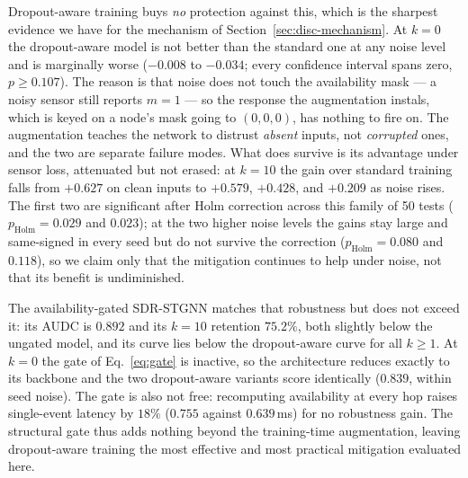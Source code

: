 \documentclass[3p,times,procedia]{elsarticle}
\begin{document}
Dropout-aware training buys \emph{no} protection against this, which is the sharpest evidence we have for the mechanism of Section~\ref{sec:disc-mechanism}. At $k=0$ the dropout-aware model is not better than the standard one at any noise level and is marginally worse ($-0.008$ to $-0.034$; every confidence interval spans zero, $p\ge0.107$). The reason is that noise does not touch the availability mask --- a noisy sensor still reports $m=1$ --- so the response the augmentation instals, which is keyed on a node's mask going to $(0,0,0)$, has nothing to fire on. The augmentation teaches the network to distrust \emph{absent} inputs, not \emph{corrupted} ones, and the two are separate failure modes. What does survive is its advantage under sensor loss, attenuated but not erased: at $k=10$ the gain over standard training falls from $+0.627$ on clean inputs to $+0.579$, $+0.428$, and $+0.209$ as noise rises. The first two are significant after Holm correction across this family of 50 tests ($p_{\text{Holm}}=0.029$ and $0.023$); at the two higher noise levels the gains stay large and same-signed in every seed but do not survive the correction ($p_{\text{Holm}}=0.080$ and $0.118$), so we claim only that the mitigation continues to help under noise, not that its benefit is undiminished.

The availability-gated SDR-STGNN matches that robustness but does not exceed it: its AUDC is $0.892$ and its $k=10$ retention $75.2\%$, both slightly below the ungated model, and its curve lies below the dropout-aware curve for all $k\ge1$. At $k=0$ the gate of Eq.~\eqref{eq:gate} is inactive, so the architecture reduces exactly to its backbone and the two dropout-aware variants score identically ($0.839$, within seed noise). The gate is also not free: recomputing availability at every hop raises single-event latency by $18\%$ ($0.755$ against $0.639$\,ms) for no robustness gain. The structural gate thus adds nothing beyond the training-time augmentation, leaving dropout-aware training the most effective and most practical mitigation evaluated here.
\end{document}
